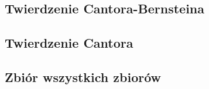 \subsection{Twierdzenie Cantora-Bernsteina}


\subsection{Twierdzenie Cantora}


\subsection{Zbiór wszystkich zbiorów}
